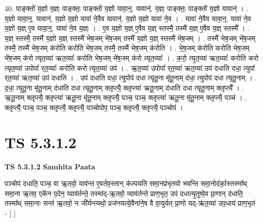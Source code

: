 \documentclass[17pt]{extarticle}
\begin{document}
40. पाङ्क्तो॑ य॒ज्ञो य॒ज्ञ्ः पाङ्क्तः॒ पाङ्क्तो॑ य॒ज्ञो यावा॒न्॒. यावान्॑. य॒ज्ञ्ः पाङ्क्तः॒ पाङ्क्तो॑ य॒ज्ञो यावान्॑ । . य॒ज्ञो यावा॒न्॒. यावान्॑. य॒ज्ञो य॒ज्ञो यावा॑ ने॒वैव यावान्॑. य॒ज्ञो य॒ज्ञो यावा॑ ने॒व । . यावा॑ ने॒वैव यावा॒न्॒. यावा॑ ने॒व य॒ज्ञो य॒ज्ञ् ए॒व यावा॒न्॒. यावा॑ ने॒व य॒ज्ञ्ः । . ए॒व य॒ज्ञो य॒ज्ञ् ए॒वैव य॒ज्ञ् स्तस्मै॒ तस्मै॑ य॒ज्ञ् ए॒वैव य॒ज्ञ् स्तस्मै᳚ । . य॒ज्ञ् स्तस्मै॒ तस्मै॑ य॒ज्ञो य॒ज्ञ् स्तस्मै॑ भेष॒जम् भे॑ष॒जम् तस्मै॑ य॒ज्ञो य॒ज्ञ् स्तस्मै॑ भेष॒जम् । . तस्मै॑ भेष॒जम् भे॑ष॒जम् तस्मै॒ तस्मै॑ भेष॒जम् क॑रोति करोति भेष॒जम् तस्मै॒ तस्मै॑ भेष॒जम् क॑रोति । . भे॒ष॒जम् क॑रोति करोति भेष॒जम् भे॑ष॒जम् क॑रो त्यृत॒व्या॑ ऋत॒व्याः᳚ करोति भेष॒जम् भे॑ष॒जम् क॑रो त्यृत॒व्याः᳚ । . क॒रो॒ त्यृ॒त॒व्या॑ ऋत॒व्याः᳚ करोति करो त्यृत॒व्या॑ उपोपा᳚ र्‌त॒व्याः᳚ करोति करो त्यृत॒व्या॑ उप॑ । . ऋ॒त॒व्या॑ उपोपा᳚ र्‌त॒व्या॑ ऋत॒व्या॑ उप॑ दधाति दधा॒ त्युपा᳚ र्‌त॒व्या॑ ऋत॒व्या॑ उप॑ दधाति । . उप॑ दधाति दधा॒ त्युपोप॑ दधा त्यृतू॒ना मृ॑तू॒नाम् द॑धा॒ त्युपोप॑ दधा त्यृतू॒नाम् । . द॒धा॒ त्यृ॒तू॒ना मृ॑तू॒नाम् द॑धाति दधा त्यृतू॒नाम् क्लृप्त्यै॒ क्लृप्त्या॑ ऋतू॒नाम् द॑धाति दधा त्यृतू॒नाम् क्लृप्त्यै᳚ । . ऋ॒तू॒नाम् क्लृप्त्यै॒ क्लृप्त्या॑ ऋतू॒ना मृ॑तू॒नाम् क्लृप्त्यै॒ पञ्च॒ पञ्च॒ क्लृप्त्या॑ ऋतू॒ना मृ॑तू॒नाम् क्लृप्त्यै॒ पञ्च॑ । . क्लृप्त्यै॒ पञ्च॒ पञ्च॒ क्लृप्त्यै॒ क्लृप्त्यै॒ पञ्चोपोप॒ पञ्च॒ क्लृप्त्यै॒ क्लृप्त्यै॒ पञ्चोप॑ । \newline
\pagebreak
{}

\section{ TS 5.3.1.2 }

\textbf{TS 5.3.1.2 } \newline
\textbf{Samhita Paata} \newline

पञ्चोप॑ दधाति॒ पञ्च॒ वा ऋ॒तवो॒ याव॑न्त ए॒वर्तव॒स्तान् क॑ल्पयति समा॒नप्र॑भृतयो भवन्ति समा॒नोद॑र्का॒स्तस्मा᳚थ् समा॒ना ऋ॒तव॒ एके॑न प॒देन॒ व्याव॑र्तन्ते॒ तस्मा॑द्-ऋ॒तवो॒ व्याव॑र्तन्ते प्राण॒भृत॒ उप॑ दधात्यृ॒तुष्वे॒व प्रा॒णान् द॑धाति॒ तस्मा᳚थ् समा॒नाः सन्त॑ ऋ॒तवो॒ न जी᳚र्यन्त्यथो॒ प्रज॑नयत्ये॒वैना॑ने॒ष वै वा॒युर्यत् प्रा॒णो यद्-ऋ॑त॒व्या॑ उप॒धाय॑ प्राण॒भृत॑ - [  ] \newline
\end{document}
